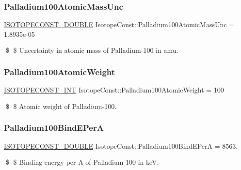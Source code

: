 \subsubsection{\texorpdfstring{Palladium100\+Atomic\+Mass\+Unc}{Palladium100AtomicMassUnc}}
{\footnotesize\ttfamily \mbox{\hyperlink{group___isotope_const-_macros_ga8f45a7272ce02c0b4c65c44636ed719a}{I\+S\+O\+T\+O\+P\+E\+C\+O\+N\+S\+T\+\_\+\+D\+O\+U\+B\+LE}} Isotope\+Const\+::\+Palladium100\+Atomic\+Mass\+Unc = 1.\+8935e-\/05}

\$ \$ Uncertainty in atomic mass of Palladium-\/100 in amu. \mbox{\label{group___isotope_const-_palladium-_pd100_gae0111a3138e1ee7b68d6ce7286d29707}} 
\subsubsection{\texorpdfstring{Palladium100\+Atomic\+Weight}{Palladium100AtomicWeight}}
{\footnotesize\ttfamily \mbox{\hyperlink{group___isotope_const-_macros_ga5f18360b3e99483a35c32d789e62621c}{I\+S\+O\+T\+O\+P\+E\+C\+O\+N\+S\+T\+\_\+\+I\+NT}} Isotope\+Const\+::\+Palladium100\+Atomic\+Weight = 100}

\$ \$ Atomic weight of Palladium-\/100. \mbox{\label{group___isotope_const-_palladium-_pd100_gaf3bd96e26c7e2606b95bd7997ca6c58c}} 
\subsubsection{\texorpdfstring{Palladium100\+Bind\+E\+PerA}{Palladium100BindEPerA}}
{\footnotesize\ttfamily \mbox{\hyperlink{group___isotope_const-_macros_ga8f45a7272ce02c0b4c65c44636ed719a}{I\+S\+O\+T\+O\+P\+E\+C\+O\+N\+S\+T\+\_\+\+D\+O\+U\+B\+LE}} Isotope\+Const\+::\+Palladium100\+Bind\+E\+PerA = 8563.}

\$ \$ Binding energy per A of Palladium-\/100 in keV. \mbox{\label{group___isotope_const-_palladium-_pd100_gaa8d86b9786e80c522478b02106c0b611}} 
